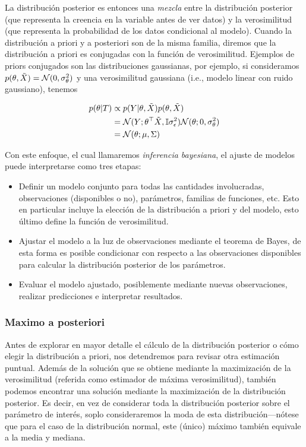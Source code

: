 La distribución posterior es entonces una \emph{mezcla} entre la distribución posterior (que representa la creencia en la variable antes de ver datos) y la verosimilitud (que representa la probabilidad de los datos condicional al modelo). Cuando la distribución a priori y a posteriori son de la misma familia, diremos que  la distribución a priori es conjugadas con la función de verosimilitud. Ejemplos de priors conjugados son las distribuciones gaussianas, por ejemplo, si consideramos $p(\theta,\tilde{X}) = {\mathcal N}(0,\sigma_\theta^2)$ y una verosimilitud gaussiana (i.e., modelo linear con ruido gaussiano), tenemos

\begin{align}
	p(\theta|T)	&\propto p(Y|\theta,\tilde{X})p(\theta,\tilde{X})\label{eq:gaussian_post}\\
				&= {\mathcal N}(Y;\theta^\top\tilde{X},{\mathbb I}\sigma_\epsilon^2){\mathcal N}(\theta;0,\sigma_\theta^2)\nonumber\\
				&={\mathcal N}(\theta; \mu,\Sigma)\nonumber
\end{align}





Con este enfoque, el cual llamaremos \emph{inferencia bayesiana}, el ajuste de modelos puede interpretarse como tres etapas:

\begin{itemize}
	\item Definir un modelo conjunto para todas las cantidades involucradas, observaciones (disponibles o no), parámetros, familias de funciones, etc. Esto en particular incluye la elección de la distribución a priori y del modelo, esto último define la función de verosimilitud.
	\item Ajustar el modelo a la luz de observaciones mediante el teorema de Bayes, de esta forma es posible condicionar con respecto a las observaciones disponibles para calcular la distribución posterior de los parámetros.  
	\item Evaluar el modelo ajustado, posiblemente mediante nuevas observaciones, realizar predicciones e  interpretar resultados.
\end{itemize}



\subsubsection{Maximo a posteriori} %
\label{sub:map}

Antes de explorar en mayor detalle el cálculo de la distribución posterior o cómo elegir la distribución a priori, nos detendremos para revisar otra estimación puntual. Además de la solución que se obtiene mediante la maximización de la verosimilitud (referida como estimador de máxima verosimilitud), también podemos encontrar una solución mediante la maximización de la distribución posterior. Es decir, en vez de considerar toda la distribución posterior sobre el parámetro de interés, soplo consideraremos la moda de esta distribución---nótese que para el caso de la distribución normal, este (único) máximo también equivale a la media y mediana.

